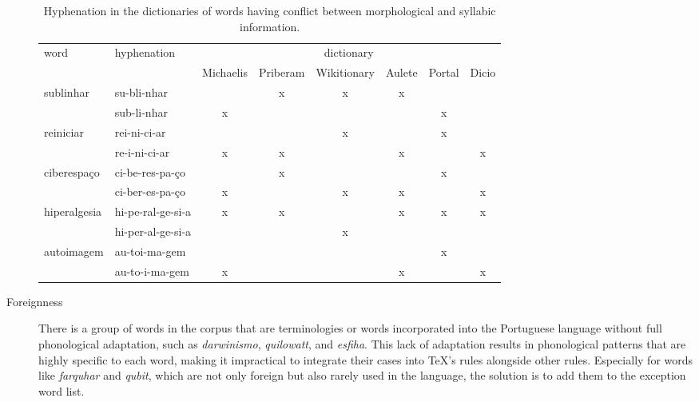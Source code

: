 \begin{description}
	\begin{table}
	\centering
	\scriptsize
	\caption{Hyphenation in the dictionaries of words having conflict between morphological and syllabic information.}
	\label{tab-mor-syl}
        \begin{tabular}{ll*{6}{c}}
	\toprule
	    word                      & hyphenation       & \multicolumn{6}{c}{dictionary} \\
             &                                            & Michaelis & Priberam & Wikitionary & Aulete & Portal & Dicio \\
	\midrule
        \multirow{2}{*}{sublinhar}    & su-bli-nhar       &           & x        & x           & x      &        &       \\
				      & sub-li-nhar       & x         &          &             &        & x      &       \\
	\midrule
	\multirow{2}{*}{reiniciar}    & rei-ni-ci-ar      &           &          & x           &        & x      &       \\
				      & re-i-ni-ci-ar     & x         & x        &             & x      &        & x     \\
	\midrule
	\multirow{2}{*}{ciberespaço}  & ci-be-res-pa-ço   &           & x        &             &        & x      &       \\
				      & ci-ber-es-pa-ço   & x         &          & x           & x      &        & x     \\
	\midrule
	\multirow{2}{*}{hiperalgesia} & hi-pe-ral-ge-si-a & x         & x        &             & x      & x      & x     \\
				      & hi-per-al-ge-si-a &           &          & x           &        &        &       \\
	\midrule
	\multirow{2}{*}{autoimagem}   & au-toi-ma-gem     &           &          &             &        & x      &       \\
				      & au-to-i-ma-gem    & x         &          &             & x      &        & x     \\
	\bottomrule
	\end{tabular}
	\end{table}

    \item [Foreignness\label{foreignness}] There is a group of words in the
      corpus that are terminologies or words incorporated into the Portuguese
      language without full phonological adaptation, such as \emph{darwinismo},
      \emph{quilowatt}, and \emph{esfiha}. This lack of adaptation results in
      phonological patterns that are highly specific to each word, making it
      impractical to integrate their cases into \TeX{}'s rules alongside other
      rules. Especially for words like \emph{farquhar} and \emph{qubit}, which
      are not only foreign but also rarely used in the language, the solution
      is to add them to the exception word list.


\end{description}
